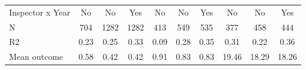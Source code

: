 \begin{tabular}{lccc|ccc|ccc}
Inspector x Year&          No         &          No         &         Yes         &          No         &          No         &         Yes         &          No         &          No         &         Yes         \\
N           &         704         &        1282         &        1282         &         413         &         549         &         535         &         377         &         458         &         444         \\
R2          &        0.23         &        0.25         &        0.33         &        0.09         &        0.28         &        0.35         &        0.31         &        0.22         &        0.36         \\
Mean outcome&        0.58         &        0.42         &        0.42         &        0.91         &        0.83         &        0.83         &       19.46         &       18.29         &       18.26         \\
\bottomrule \end{tabular}
